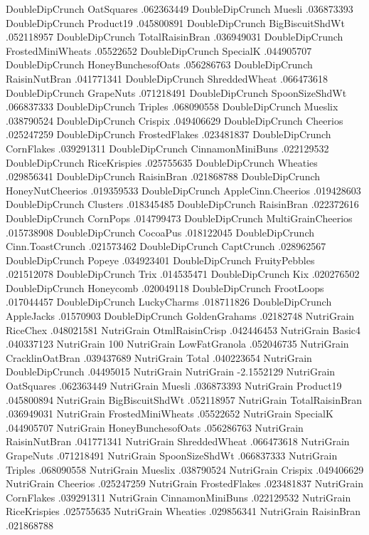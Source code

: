 DoubleDipCrunch	OatSquares	.062363449
DoubleDipCrunch	Muesli	.036873393
DoubleDipCrunch	Product19	.045800891
DoubleDipCrunch	BigBiscuitShdWt	.052118957
DoubleDipCrunch	TotalRaisinBran	.036949031
DoubleDipCrunch	FrostedMiniWheats	.05522652
DoubleDipCrunch	SpecialK	.044905707
DoubleDipCrunch	HoneyBunchesofOats	.056286763
DoubleDipCrunch	RaisinNutBran	.041771341
DoubleDipCrunch	ShreddedWheat	.066473618
DoubleDipCrunch	GrapeNuts	.071218491
DoubleDipCrunch	SpoonSizeShdWt	.066837333
DoubleDipCrunch	Triples	.068090558
DoubleDipCrunch	Mueslix	.038790524
DoubleDipCrunch	Crispix	.049406629
DoubleDipCrunch	Cheerios	.025247259
DoubleDipCrunch	FrostedFlakes	.023481837
DoubleDipCrunch	CornFlakes	.039291311
DoubleDipCrunch	CinnamonMiniBuns	.022129532
DoubleDipCrunch	RiceKrispies	.025755635
DoubleDipCrunch	Wheaties	.029856341
DoubleDipCrunch	RaisinBran	.021868788
DoubleDipCrunch	HoneyNutCheerios	.019359533
DoubleDipCrunch	AppleCinn.Cheerios	.019428603
DoubleDipCrunch	Clusters	.018345485
DoubleDipCrunch	RaisinBran	.022372616
DoubleDipCrunch	CornPops	.014799473
DoubleDipCrunch	MultiGrainCheerios	.015738908
DoubleDipCrunch	CocoaPus	.018122045
DoubleDipCrunch	Cinn.ToastCrunch	.021573462
DoubleDipCrunch	CaptCrunch	.028962567
DoubleDipCrunch	Popeye	.034923401
DoubleDipCrunch	FruityPebbles	.021512078
DoubleDipCrunch	Trix	.014535471
DoubleDipCrunch	Kix	.020276502
DoubleDipCrunch	Honeycomb	.020049118
DoubleDipCrunch	FrootLoops	.017044457
DoubleDipCrunch	LuckyCharms	.018711826
DoubleDipCrunch	AppleJacks	.01570903
DoubleDipCrunch	GoldenGrahams	.02182748
NutriGrain	RiceChex	.048021581
NutriGrain	OtmlRaisinCrisp	.042446453
NutriGrain	Basic4	.040337123
NutriGrain	100%
NutriGrain	LowFatGranola	.052046735
NutriGrain	CracklinOatBran	.039437689
NutriGrain	Total	.040223654
NutriGrain	DoubleDipCrunch	.04495015
NutriGrain	NutriGrain	-2.1552129
NutriGrain	OatSquares	.062363449
NutriGrain	Muesli	.036873393
NutriGrain	Product19	.045800894
NutriGrain	BigBiscuitShdWt	.052118957
NutriGrain	TotalRaisinBran	.036949031
NutriGrain	FrostedMiniWheats	.05522652
NutriGrain	SpecialK	.044905707
NutriGrain	HoneyBunchesofOats	.056286763
NutriGrain	RaisinNutBran	.041771341
NutriGrain	ShreddedWheat	.066473618
NutriGrain	GrapeNuts	.071218491
NutriGrain	SpoonSizeShdWt	.066837333
NutriGrain	Triples	.068090558
NutriGrain	Mueslix	.038790524
NutriGrain	Crispix	.049406629
NutriGrain	Cheerios	.025247259
NutriGrain	FrostedFlakes	.023481837
NutriGrain	CornFlakes	.039291311
NutriGrain	CinnamonMiniBuns	.022129532
NutriGrain	RiceKrispies	.025755635
NutriGrain	Wheaties	.029856341
NutriGrain	RaisinBran	.021868788
